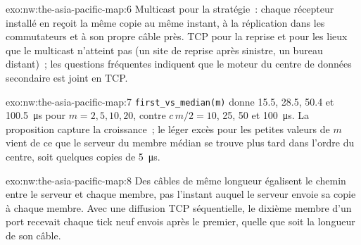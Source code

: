 \begin{solution}{exo:nw:the-asia-pacific-map:6}
Multicast pour la stratégie~: chaque récepteur installé en  reçoit la même copie au même instant, à la réplication dans les commutateurs et à son propre câble près.
TCP pour la reprise et pour les lieux que le multicast n'atteint pas (un site de reprise après sinistre, un bureau distant)~; les questions fréquentes
indiquent que le moteur du centre de données secondaire est joint en TCP.
\end{solution}

\begin{solution}{exo:nw:the-asia-pacific-map:7}
\texttt{first\_vs\_median(m)} donne 15.5, 28.5, 50.4 et \qty{100.5}{\micro\second} pour $m = 2, 5, 10, 20$, contre $c\,m/2 = 10$, 25, 50 et
\qty{100}{\micro\second}. La proposition capture la croissance~; le léger excès pour les petites valeurs de $m$ vient de ce que le serveur du membre médian se trouve plus tard
dans l'ordre du centre, soit quelques copies de \qty{5}{\micro\second}.
\end{solution}

\begin{solution}{exo:nw:the-asia-pacific-map:8}
Des câbles de même longueur égalisent le chemin entre le serveur et chaque membre, pas l'instant auquel le serveur envoie sa copie à chaque membre. Avec une
diffusion TCP séquentielle, le dixième membre d'un port recevait chaque tick neuf envois après le premier, quelle que soit la longueur de son câble.
\end{solution}

